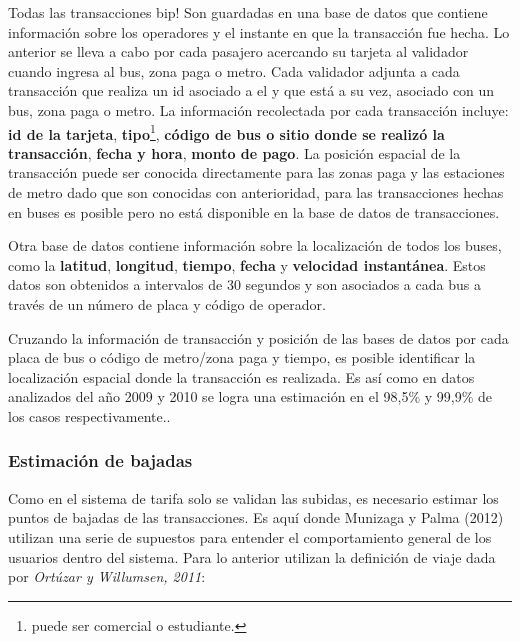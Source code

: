 \documentclass[12pt]{article}
\begin{document}
Todas las transacciones bip! Son guardadas en una base de datos que contiene información sobre los operadores y el instante en que la transacción fue hecha. Lo anterior se lleva a cabo por cada pasajero acercando su tarjeta al validador cuando ingresa al bus, zona paga o metro. Cada validador adjunta a cada transacción que realiza un id asociado a el y que está a su vez, asociado con un bus, zona paga o metro. La información recolectada por cada transacción incluye: \textbf{id de la tarjeta}, \textbf{tipo}\footnote{puede ser comercial o estudiante.},  \textbf{código de bus o sitio donde se realizó la transacción}, \textbf{fecha y hora}, \textbf{monto de pago}. La posición espacial de la transacción puede ser conocida directamente para las zonas paga y las estaciones de metro dado que son conocidas con anterioridad, para las transacciones hechas en buses es posible pero no está disponible en la base de datos de transacciones.


Otra base de datos contiene información sobre la localización de todos los buses, como la \textbf{latitud}, \textbf{longitud}, \textbf{tiempo}, \textbf{fecha} y \textbf{velocidad instantánea}. Estos datos son obtenidos a intervalos de 30 segundos y son asociados a cada bus a través de un número de placa y código de operador.

Cruzando la información de transacción y posición de las bases de datos por cada placa de bus o código de metro/zona paga y tiempo, es posible identificar la localización espacial donde la transacción es realizada. Es así como en datos analizados del año 2009 y 2010 se logra una estimación en el 98,5\% y 99,9\% de los casos respectivamente.\cite{Procesamiento_datos}.

\subsubsection{Estimación de bajadas}

Como en el sistema de tarifa solo se validan las subidas, es necesario estimar los puntos de bajadas de las transacciones. Es aquí donde Munizaga y Palma (2012)\cite{Procesamiento_datos} utilizan una serie de supuestos para entender el comportamiento general de los usuarios dentro del sistema. Para lo anterior utilizan la definición de viaje dada por \textit{Ortúzar y Willumsen, 2011}\cite{Viaje}:
\end{document}
